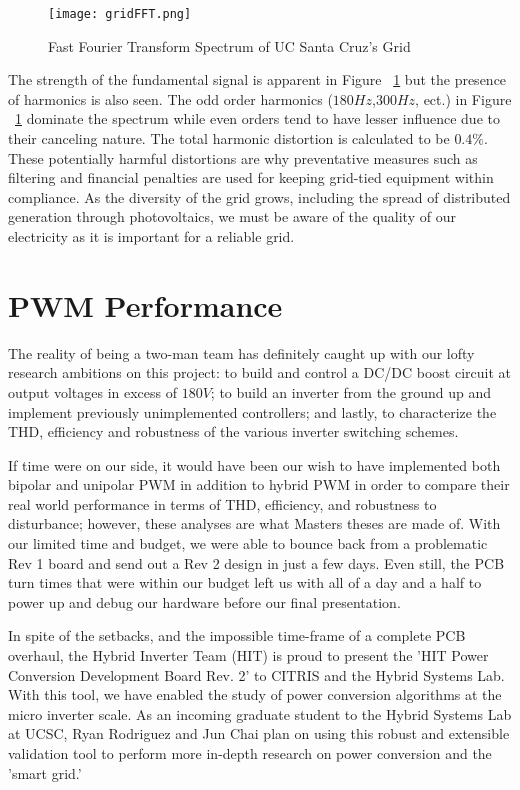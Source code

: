 \begin{figure}
\centering
\texttt{[image: gridFFT.png]}
\caption{Fast Fourier Transform Spectrum of UC Santa Cruz's Grid}
\label{gridFFT}
\end{figure}

The strength of the fundamental signal is apparent in Figure ~\ref{gridFFT} but the presence of harmonics is also seen. The odd order harmonics ($180 Hz$,$300 Hz$, ect.) in  Figure ~\ref{gridFFT} dominate the spectrum while even orders tend to have lesser influence due to their canceling nature. The total harmonic distortion is calculated to be $0.4\%$. These potentially harmful distortions are why preventative measures such as filtering and financial penalties are used for keeping grid-tied equipment within compliance. As the diversity of the grid grows, including the spread of distributed generation through photovoltaics, we must be aware of the quality of our electricity as it is important for a reliable grid.

\section{PWM Performance}
The reality of being a two-man team has definitely caught up with our lofty research ambitions on this project: to build and control a DC/DC boost circuit at output voltages in excess of $180V$; to build an inverter from the ground up and implement previously unimplemented controllers; and lastly, to characterize the THD, efficiency and robustness of the various inverter switching schemes.

If time were on our side, it would have been our wish to have implemented both bipolar and unipolar PWM in addition to hybrid PWM in order to compare their real world performance in terms of THD, efficiency, and robustness to disturbance; however, these analyses are what Masters theses are made of. With our limited time and budget, we were able to bounce back from a problematic Rev 1 board and send out a Rev 2 design in just a few days. Even still, the PCB turn times that were within our budget left us with all of a day and a half to power up and debug our hardware before our final presentation. 


In spite of the setbacks, and the impossible time-frame of a complete PCB overhaul, the Hybrid Inverter Team (HIT) is proud to present the 'HIT Power Conversion Development Board Rev. 2' to CITRIS and the Hybrid Systems Lab. With this tool, we have enabled the study of power conversion algorithms at the micro inverter scale. As an incoming graduate student to the Hybrid Systems Lab at UCSC, Ryan Rodriguez and Jun Chai plan on using this robust and extensible validation tool to perform more in-depth research on power conversion and the 'smart grid.' 


